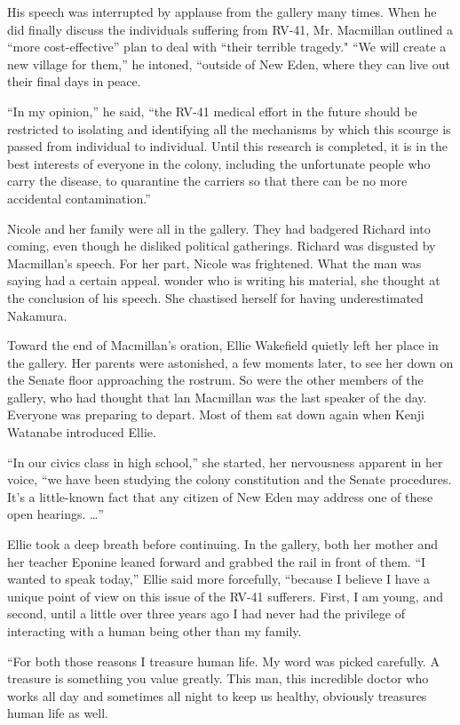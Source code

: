 \documentclass[]{article}
\begin{document}
{His speech was interrupted by applause from the gallery many times.  When he did finally discuss the individuals suffering from RV-41, Mr.  Macmillan outlined a “more cost-effective” plan to deal with “their terrible tragedy."  “We will create a new village for them,” he intoned, “outside of New Eden, where they can live out their final days in peace.

“In my opinion,” he said, “the RV-41 medical effort in the future should be restricted to isolating and identifying all the mechanisms by which this scourge is passed from individual to individual.  Until this research is completed, it is in the best interests of everyone in the colony, including the unfortunate people who carry the disease, to quarantine the carriers so that there can be no more accidental contamination.”

Nicole and her family were all in the gallery.  They had badgered Richard into coming, even though he disliked political gatherings.  Richard was disgusted by Macmillan’s speech.  For her part, Nicole was frightened.  What the man was saying had a certain appeal.  wonder who is writing his material, she thought at the conclusion of his speech.  She chastised herself for having underestimated Nakamura.

Toward the end of Macmillan’s oration, Ellie Wakefield quietly left her place in the gallery.  Her parents were astonished, a few moments later, to see her down on the Senate floor approaching the rostrum.  So were the other members of the gallery, who had thought that lan Macmillan was the last speaker of the day.  Everyone was preparing to depart.  Most of them sat down again when Kenji Watanabe introduced Ellie.

“In our civics class in high school,” she started, her nervousness apparent in her voice, “we have been studying the colony constitution and the Senate procedures.  It’s a little-known fact that any citizen of New Eden may address one of these open hearings.  …”

Ellie took a deep breath before continuing.  In the gallery, both her mother and her teacher Eponine leaned forward and grabbed the rail in front of them.  “I wanted to speak today,” Ellie said more forcefully, “because I believe I have a unique point of view on this issue of the RV-41 sufferers.  First, I am young, and second, until a little over three years ago I had never had the privilege of interacting with a human being other than my family.

“For both those reasons I treasure human life.  My word was picked carefully.  A treasure is something you value greatly.  This man, this incredible doctor who works all day and sometimes all night to keep us healthy, obviously treasures human life as well.

}
\end{document}
